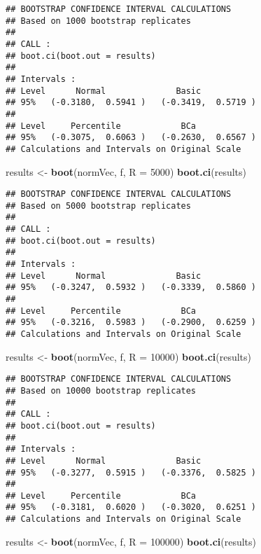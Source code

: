 \documentclass[]{article}
\newenvironment{Shaded}{\begin{snugshade}}{\end{snugshade}}
\newcommand{\KeywordTok}[1]{\textcolor[rgb]{0.13,0.29,0.53}{\textbf{#1}}}
\newcommand{\DataTypeTok}[1]{\textcolor[rgb]{0.13,0.29,0.53}{#1}}
\newcommand{\DecValTok}[1]{\textcolor[rgb]{0.00,0.00,0.81}{#1}}
\newcommand{\StringTok}[1]{\textcolor[rgb]{0.31,0.60,0.02}{#1}}
\newcommand{\NormalTok}[1]{#1}
\begin{document}
\begin{verbatim}
## BOOTSTRAP CONFIDENCE INTERVAL CALCULATIONS
## Based on 1000 bootstrap replicates
## 
## CALL : 
## boot.ci(boot.out = results)
## 
## Intervals : 
## Level      Normal              Basic         
## 95%   (-0.3180,  0.5941 )   (-0.3419,  0.5719 )  
## 
## Level     Percentile            BCa          
## 95%   (-0.3075,  0.6063 )   (-0.2630,  0.6567 )  
## Calculations and Intervals on Original Scale
\end{verbatim}

\begin{Shaded}
\begin{Highlighting}[]
\NormalTok{results <-}\StringTok{ }\KeywordTok{boot}\NormalTok{(normVec, f, }\DataTypeTok{R =} \DecValTok{5000}\NormalTok{)}
\KeywordTok{boot.ci}\NormalTok{(results)}
\end{Highlighting}
\end{Shaded}

\begin{verbatim}
## BOOTSTRAP CONFIDENCE INTERVAL CALCULATIONS
## Based on 5000 bootstrap replicates
## 
## CALL : 
## boot.ci(boot.out = results)
## 
## Intervals : 
## Level      Normal              Basic         
## 95%   (-0.3247,  0.5932 )   (-0.3339,  0.5860 )  
## 
## Level     Percentile            BCa          
## 95%   (-0.3216,  0.5983 )   (-0.2900,  0.6259 )  
## Calculations and Intervals on Original Scale
\end{verbatim}

\begin{Shaded}
\begin{Highlighting}[]
\NormalTok{results <-}\StringTok{ }\KeywordTok{boot}\NormalTok{(normVec, f, }\DataTypeTok{R =} \DecValTok{10000}\NormalTok{)}
\KeywordTok{boot.ci}\NormalTok{(results)}
\end{Highlighting}
\end{Shaded}

\begin{verbatim}
## BOOTSTRAP CONFIDENCE INTERVAL CALCULATIONS
## Based on 10000 bootstrap replicates
## 
## CALL : 
## boot.ci(boot.out = results)
## 
## Intervals : 
## Level      Normal              Basic         
## 95%   (-0.3277,  0.5915 )   (-0.3376,  0.5825 )  
## 
## Level     Percentile            BCa          
## 95%   (-0.3181,  0.6020 )   (-0.3020,  0.6251 )  
## Calculations and Intervals on Original Scale
\end{verbatim}

\begin{Shaded}
\begin{Highlighting}[]
\NormalTok{results <-}\StringTok{ }\KeywordTok{boot}\NormalTok{(normVec, f, }\DataTypeTok{R =} \DecValTok{100000}\NormalTok{)}
\KeywordTok{boot.ci}\NormalTok{(results)}
\end{Highlighting}
\end{Shaded}
\end{document}
